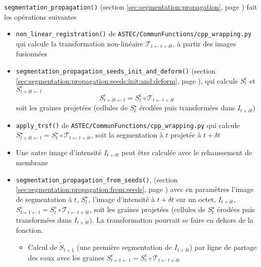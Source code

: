 \documentclass{article}
\begin{document}
\texttt{segmentation\_propagation()} (section \ref{sec:segmentation:propagation}, page \pageref{sec:segmentation:propagation}) fait les op\'erations suivantes
\begin{itemize}
\itemsep -0.5ex

\item \texttt{non\_linear\_registration()} de \texttt{ASTEC/CommunFunctions/cpp\_wrapping.py} qui calcule  la transformation non-lin\'eaire $\mathcal{T}_{t \leftarrow t+\delta t}$, \`a partir des images fusionn\'ees

\item \texttt{segmentation\_propagation\_seeds\_init\_and\_deform()} (section \ref{sec:segmentation:propagation:seeds:init:and:deform}, page \pageref{sec:segmentation:propagation:seeds:init:and:deform}),
qui calcule $S^e_t$ et $S^e_{t+\delta t \leftarrow t}$
\begin{displaymath}
S^e_{t+\delta t \leftarrow t} = S^e_t \circ \mathcal{T}_{t \leftarrow t+\delta t}
\end{displaymath}
soit les graines projet\'ees (cellules de $S^{\star}_t$ \'erod\'ees puis transform\'ees dans $I_{t+\delta t}$) \cite[section 2.3.3.4]{guignard:tel-01278725}

\item \texttt{apply\_trsf()} de \texttt{ASTEC/CommunFunctions/cpp\_wrapping.py} qui calcule $S^{\star}_{t+\delta t \leftarrow t} = S^{\star}_t \circ \mathcal{T}_{t \leftarrow t+\delta t}$, soit la segmentation \`a $t$ projet\'ee \`a $t + \delta t$

\item Une autre image d'intensit\'e $I_{t + \delta t}$ peut \^etre calcul\'ee avec le rehaussement de membrane





%
%
\item \texttt{segmentation\_propagation\_from\_seeds()}, (section \ref{sec:segmentation:propagation:from:seeds}, page \pageref{sec:segmentation:propagation:from:seeds}) avec en param\`etres
l'image de segmentation \`a $t$, $S^{\star}_t$,
l'image d'intensit\'e \`a $t + \delta t$ sur un octet,  $I_{t+\delta t}$,
$S^e_{t+1 \leftarrow t} = S^e_t \circ \mathcal{T}_{t \leftarrow t+\delta t}$, soit les graines projet\'ees (cellules de $S^{\star}_t$ \'erod\'ees puis transform\'ees dans $I_{t+\delta t}$). La transformation pourrait se faire en dehors de la fonction.

\begin{itemize}
\item Calcul de $\tilde{S}_{t+1}$ (une premi\`ere segmentation de $I_{t + \delta t}$) par ligne de partage des eaux avec les graines $S^e_{t+1 \leftarrow t} = S^e_t \circ \mathcal{T}_{t \leftarrow t+\delta t}$


\end{itemize}
\end{itemize}
\end{document}
